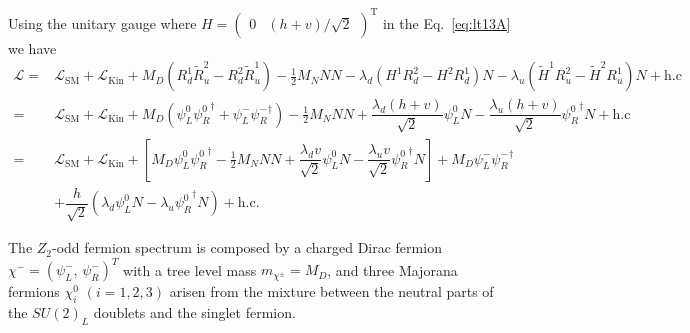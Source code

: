 Using the unitary gauge where  $H=\begin{pmatrix}0 & (h+v)/\sqrt{2}\end{pmatrix}^{\operatorname{T}}$ in the Eq.~\eqref{eq:lt13A} we have
\begin{align}
\label{eq:lt13a-expanded}
\mathcal{L}= &\mathcal{L}_{\text{SM}}+\mathcal{L}_{\text{Kin}}+ M_D(R_d^1\widetilde{R}_u^2-R_d^2\widetilde{R}_u^1)-\tfrac{1}{2}M_N NN
-\lambda_d(H^1R_d^2-H^2R_d^1)N-\lambda_u(\widetilde{H}^1R_u^2-\widetilde{H}^2R_u^1)N+\text{h.c}\nonumber \\
=&\mathcal{L}_{\text{SM}}+\mathcal{L}_{\text{Kin}}+ M_D(\psi_L^0{\psi_{R}^0 }^{\dagger}+\psi_L^-{\psi_{R}^- }^{\dagger})-\tfrac{1}{2}M_N NN
+\dfrac{\lambda_d (h+v)}{\sqrt{2}}\psi_L^0N - \dfrac{\lambda_u (h+v)}{\sqrt{2}}{\psi_R^0}^{\dagger}N +\text{h.c}\nonumber\\
=&\mathcal{L}_{\text{SM}}+\mathcal{L}_{\text{Kin}}+ \left[M_D\psi_L^0{\psi_{R}^0 }^{\dagger}-\tfrac{1}{2}M_N NN + \dfrac{\lambda_d v}{\sqrt{2}}\psi_L^0N - \dfrac{\lambda_u v}{\sqrt{2}}{\psi_R^0}^{\dagger}N\right]
+ M_D\psi_L^-{\psi_{R}^- }^{\dagger}
\nonumber\\ & 
+ \dfrac{h}{\sqrt{2}}\left(\lambda_d\psi_L^0N - \lambda_u{\psi_R^0}^{\dagger}N\right)+\text{h.c}.
%
\end{align}

The $Z_2$-odd fermion spectrum is composed by a
charged Dirac fermion $\chi^-=(\psi^-_L,\, \psi^-_R)^T$ with a tree
level mass $m_{\chi^\pm}=M_D$, and three Majorana fermions $\chi_i^0$ $(i=1,2,3)$ arisen from
the mixture between the neutral parts of the $SU(2)_L$ doublets and
the singlet fermion. 



